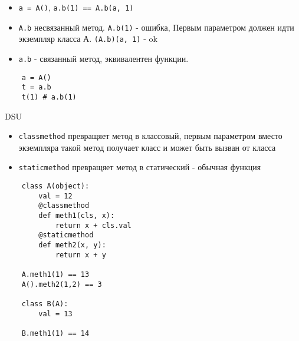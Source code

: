 \documentclass{article}
\begin{document}
\begin{itemize}
	\item \lstinline!a = A()!, \lstinline!a.b(1) == A.b(a, 1)!
	\item \lstinline!A.b! несвязанный метод. \lstinline!A.b(1)! - ошибка, 
			Первым параметром должен идти экземпляр класса А. \lstinline!(A.b)(a, 1)! - ok
	\item \lstinline!a.b! - связанный метод, эквивалентен функции.
\end{itemize}
\vspace{15pt}
\begin{lstlisting}
	a = A()
	t = a.b
	t(1) # a.b(1)
\end{lstlisting}
\newpage

DSU
\newpage

\begin{itemize}
	\item \lstinline!classmethod! превращяет метод в классовый, первым параметром вместо
		экземпляра такой метод получает класс и может быть вызван от класса
	\item \lstinline!staticmethod! превращяет метод в статический - обычная функция
\end{itemize}
\vspace{15pt}
\begin{lstlisting}
	class A(object):
		val = 12
		@classmethod
		def meth1(cls, x):
			return x + cls.val
		@staticmethod
		def meth2(x, y):
			return x + y

	A.meth1(1) == 13
	A().meth2(1,2) == 3 

	class B(A):
		val = 13

	B.meth1(1) == 14
\end{lstlisting}
\newpage
\end{document}
